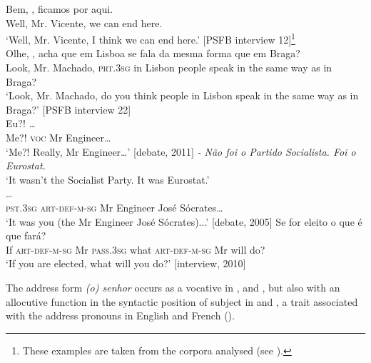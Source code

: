 \documentclass[output=paper]{langscibook}
\begin{document}
\ea\label{ex:marques:3}
 \gll Bem,   ,    {ficamos por aqui.}\\
        Well, Mr.    Vicente,    {we can end here.}\\
\glt ‘Well, Mr. Vicente,  I think we can end here.’ [PSFB interview 12]\textsuperscript{}\footnote{These examples are taken from the corpora analysed (see ).}\\
\ex\label{ex:marques:4}
 \gll Olhe,     ,    {acha que}   em Lisboa   se fala       {da mesma forma} que em Braga?\\
        Look, Mr.   Machado,    \textsc{prt.3sg}   in Lisbon   people speak   {in the same way} as   in Braga?\\
\glt ‘Look, Mr. Machado, do you think people in Lisbon speak in the same way as in Braga?’ [PSFB interview 22]\\
\ex\label{ex:marques:5}
\gll Eu?!           …\\
        Me?!  \textsc{voc}    Mr    Engineer…\\
\glt ‘Me?! Really, Mr Engineer…’ [debate, 2011]
\ex\label{ex:marques:6}
\textit{- Não foi o Partido Socialista. Foi o Eurostat.}\\
    \glt ‘It wasn’t the Socialist Party. It was Eurostat.’\\
                              …  \\
        \textsc{pst.3sg}  \textsc{art-def-m-sg}   Mr    Engineer    {José Sócrates}… \\
\glt ‘It was you (the Mr Engineer José Sócrates)...’ [debate, 2005] 
\ex\label{ex:marques:7}
\gll Se                    {for eleito}    {o que é que}                          fará?\\
        If    \textsc{art-def-m-sg}    Mr    \textsc{pass.3sg}  what   \textsc{art-def-m-sg}   Mr         {will do}?\\
\glt ‘If you are elected, what will you do?’ [interview, 2010]
\z 


The address form \textit{(o) senhor} occurs as a vocative in ,  and , but also with an allocutive function in the syntactic position of subject in  and , a trait associated with the address pronouns in English and French (\citealt{Formentelli2009, Kerbrat-Orecchioni2010, Johnen2014}).
\end{document}
